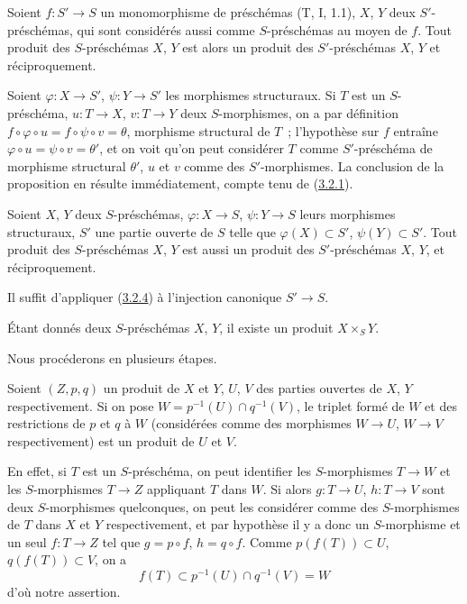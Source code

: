 \begin{proposition}[3.2.4]
\label{I.3.2.4-fr}
Soient $f:S'\to S$ un \textup{monomorphisme} de préschémas \textup{(T, I, 1.1)}, $X$, $Y$ deux
$S'$-préschémas, qui sont considérés aussi comme $S$-préschémas au moyen de
$f$. Tout produit des $S$-préschémas $X$, $Y$ est alors un produit des
$S'$-préschémas $X$, $Y$ et réciproquement.
\end{proposition}

Soient $\varphi:X\to S'$, $\psi:Y\to S'$ les morphismes structuraux. Si $T$
est un $S$-préschéma, $u:T\to X$, $v:T\to Y$ deux $S$-morphismes, on a par
définition $f\circ\varphi\circ u=f\circ\psi\circ v=\theta$, morphisme
structural de $T$~; l'hypothèse sur $f$ entraîne
$\varphi\circ u=\psi\circ v=\theta'$, et on voit qu'on peut considérer $T$
comme $S'$-préschéma de morphisme structural $\theta'$, $u$ et $v$ comme des
$S'$-morphismes. La conclusion de la proposition en résulte immédiatement,
compte tenu de (\hyperref[I.3.2.1-fr]{3.2.1}).

\begin{corollary}[3.2.5]
\label{I.3.2.5-fr}
Soient $X$, $Y$ deux $S$-préschémas, $\varphi:X\to S$, $\psi:Y\to S$ leurs
morphismes structuraux, $S'$ une partie ouverte de $S$ telle que
$\varphi(X)\subset S'$, $\psi(Y)\subset S'$. Tout produit des $S$-préschémas
$X$, $Y$ est aussi un produit des $S'$-préschémas $X$, $Y$, et réciproquement.
\end{corollary}

Il suffit d'appliquer (\hyperref[I.3.2.4-fr]{3.2.4}) à l'injection canonique
$S'\to S$.

\begin{theorem}[3.2.6]
\label{I.3.2.6-fr}
Étant donnés deux $S$-préschémas $X$, $Y$, il existe un produit
$X\times_S Y$.
\end{theorem}

Nous procéderons en plusieurs étapes.

\begin{lemma}[3.2.6.1]
\label{I.3.2.6.1-fr}
Soient $(Z,p,q)$ un produit de $X$ et $Y$, $U$, $V$ des parties ouvertes de
$X$, $Y$ respectivement. Si on pose
$W=p^{-1}(U)\cap q^{-1}(V)$, le triplet formé de $W$ et des restrictions de
$p$ et $q$ à $W$ \textup{(considérées comme des morphismes $W\to U$,
$W\to V$ respectivement)} est un produit de $U$ et $V$.
\end{lemma}

En effet, si $T$ est un $S$-préschéma, on peut identifier les $S$-morphismes
$T\to W$ et les $S$-morphismes $T\to Z$ appliquant $T$ dans $W$. Si alors
$g:T\to U$, $h:T\to V$ sont deux $S$-morphismes quelconques, on peut les
considérer comme des $S$-morphismes de $T$ dans $X$ et $Y$ respectivement, et
par hypothèse il y a donc un $S$-morphisme et un seul $f:T\to Z$ tel que
$g=p\circ f$, $h=q\circ f$. Comme $p(f(T))\subset U$, $q(f(T))\subset V$,
on a
\[
  f(T)\subset p^{-1}(U)\cap q^{-1}(V)=W
\]
d'où notre assertion.

